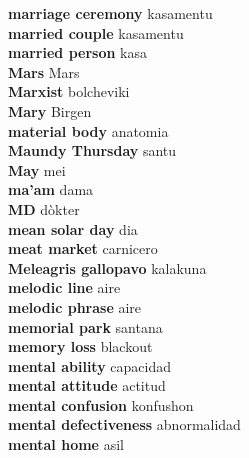 \textbf{ marriage ceremony  } kasamentu \\
\textbf{ married couple  } kasamentu \\
\textbf{ married person  } kasa \\
\textbf{ Mars  } Mars \\
\textbf{ Marxist  } bolcheviki \\
\textbf{ Mary  } Birgen \\
\textbf{ material body  } anatomia \\
\textbf{ Maundy Thursday  } santu \\
\textbf{ May  } mei \\
\textbf{ ma’am  } dama \\
\textbf{ MD  } dòkter \\
\textbf{ mean solar day  } dia \\
\textbf{ meat market  } carnicero \\
\textbf{ Meleagris gallopavo  } kalakuna \\
\textbf{ melodic line  } aire \\
\textbf{ melodic phrase  } aire \\
\textbf{ memorial park  } santana \\
\textbf{ memory loss  } blackout \\
\textbf{ mental ability  } capacidad \\
\textbf{ mental attitude  } actitud \\
\textbf{ mental confusion  } konfushon \\
\textbf{ mental defectiveness  } abnormalidad \\
\textbf{ mental home  } asil \\
